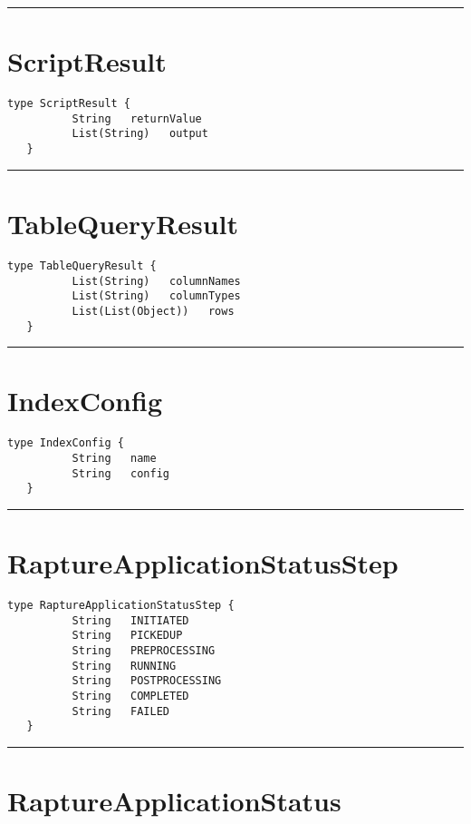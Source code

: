 \rule{12cm}{2pt}
\section{ScriptResult}
\label{type:ScriptResult}

\begin{lstlisting}[style=nonumbers]
   type ScriptResult {
          String   returnValue
          List(String)   output
   }
\end{lstlisting}

\rule{12cm}{2pt}
\section{TableQueryResult}
\label{type:TableQueryResult}

\begin{lstlisting}[style=nonumbers]
   type TableQueryResult {
          List(String)   columnNames
          List(String)   columnTypes
          List(List(Object))   rows
   }
\end{lstlisting}

\rule{12cm}{2pt}
\section{IndexConfig}
\label{type:IndexConfig}

\begin{lstlisting}[style=nonumbers]
   type IndexConfig {
          String   name
          String   config
   }
\end{lstlisting}

\rule{12cm}{2pt}
\section{RaptureApplicationStatusStep}
\label{type:RaptureApplicationStatusStep}

\begin{lstlisting}[style=nonumbers]
   type RaptureApplicationStatusStep {
          String   INITIATED
          String   PICKEDUP
          String   PREPROCESSING
          String   RUNNING
          String   POSTPROCESSING
          String   COMPLETED
          String   FAILED
   }
\end{lstlisting}

\rule{12cm}{2pt}
\section{RaptureApplicationStatus}
\label{type:RaptureApplicationStatus}


